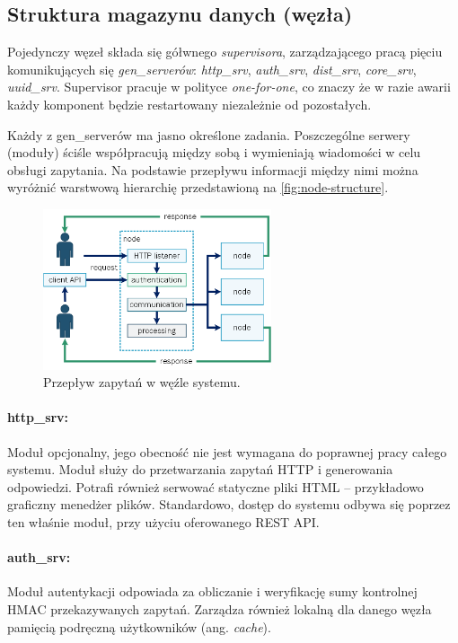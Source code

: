 \subsection{Struktura magazynu danych (węzła)}
Pojedynczy węzeł składa się gółwnego \textit{supervisora}, zarządzającego pracą pięciu komunikujących się \textit{gen\_serverów}: \textit{http\_srv}, \textit{auth\_srv}, \textit{dist\_srv}, \textit{core\_srv}, \textit{uuid\_srv}. Supervisor pracuje w polityce \textit{one-for-one}, co znaczy że w razie awarii każdy komponent będzie restartowany niezależnie od pozostałych.

Każdy z gen\_serverów ma jasno określone zadania. Poszczególne serwery (moduły) ściśle współpracują między sobą i wymieniają wiadomości w celu obsługi zapytania. Na podstawie przepływu informacji między nimi można wyróżnić warstwową hierarchię przedstawioną na \autoref{fig:node-structure}.

\begin{figure}[!htbp]
	\centering
	\includegraphics[width=0.6\textwidth]{images/fig02-node-structure.png}
	\caption{Przepływ zapytań w węźle systemu.}
	\label{fig:node-structure}
\end{figure}

\paragraph{http\_srv:} Moduł opcjonalny, jego obecność nie jest wymagana do poprawnej pracy całego systemu. Moduł służy do przetwarzania zapytań HTTP i generowania odpowiedzi. Potrafi również serwować statyczne pliki HTML – przykładowo graficzny menedżer plików. Standardowo, dostęp do systemu odbywa się poprzez ten właśnie moduł, przy użyciu oferowanego REST API.

\paragraph{auth\_srv:} Moduł autentykacji odpowiada za obliczanie i weryfikację sumy kontrolnej HMAC przekazywanych zapytań. Zarządza również lokalną dla danego węzła pamięcią podręczną użytkowników (ang. \textit{cache}).


